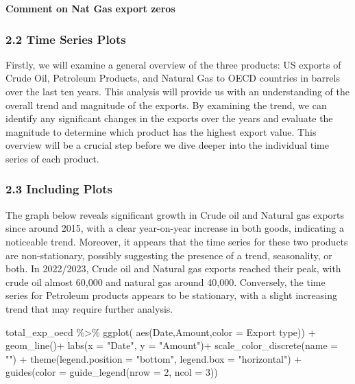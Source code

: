 \documentclass[
]{article}
\newenvironment{Shaded}{\begin{snugshade}}{\end{snugshade}}
\newcommand{\AttributeTok}[1]{\textcolor[rgb]{0.77,0.63,0.00}{#1}}
\newcommand{\DecValTok}[1]{\textcolor[rgb]{0.00,0.00,0.81}{#1}}
\newcommand{\FunctionTok}[1]{\textcolor[rgb]{0.00,0.00,0.00}{#1}}
\newcommand{\NormalTok}[1]{#1}
\newcommand{\SpecialCharTok}[1]{\textcolor[rgb]{0.00,0.00,0.00}{#1}}
\newcommand{\StringTok}[1]{\textcolor[rgb]{0.31,0.60,0.02}{#1}}
\begin{document}
\textbf{Comment on Nat Gas export zeros}

\hypertarget{time-series-plots}{%
\subsubsection{2.2 Time Series Plots}\label{time-series-plots}}

Firstly, we will examine a general overview of the three products: US
exports of Crude Oil, Petroleum Products, and Natural Gas to OECD
countries in barrels over the last ten years. This analysis will provide
us with an understanding of the overall trend and magnitude of the
exports. By examining the trend, we can identify any significant changes
in the exports over the years and evaluate the magnitude to determine
which product has the highest export value. This overview will be a
crucial step before we dive deeper into the individual time series of
each product.

\hypertarget{including-plots}{%
\subsubsection{2.3 Including Plots}\label{including-plots}}

The graph below reveals significant growth in Crude oil and Natural gas
exports since around 2015, with a clear year-on-year increase in both
goods, indicating a noticeable trend. Moreover, it appears that the time
series for these two products are non-stationary, possibly suggesting
the presence of a trend, seasonality, or both. In 2022/2023, Crude oil
and Natural gas exports reached their peak, with crude oil almost 60,000
and natural gas around 40,000. Conversely, the time series for Petroleum
products appears to be stationary, with a slight increasing trend that
may require further analysis.

\begin{Shaded}
\begin{Highlighting}[]
\NormalTok{total\_exp\_oecd }\SpecialCharTok{\%\textgreater{}\%} \FunctionTok{ggplot}\NormalTok{(}
 \FunctionTok{aes}\NormalTok{(Date,Amount,}\AttributeTok{color =} \StringTok{\textasciigrave{}}\AttributeTok{Export type}\StringTok{\textasciigrave{}}\NormalTok{)) }\SpecialCharTok{+}
   \FunctionTok{geom\_line}\NormalTok{()}\SpecialCharTok{+}
   \FunctionTok{labs}\NormalTok{(}\AttributeTok{x =} \StringTok{"Date"}\NormalTok{, }\AttributeTok{y =} \StringTok{"Amount"}\NormalTok{)}\SpecialCharTok{+}
    \FunctionTok{scale\_color\_discrete}\NormalTok{(}\AttributeTok{name =} \StringTok{""}\NormalTok{) }\SpecialCharTok{+}
  \FunctionTok{theme}\NormalTok{(}\AttributeTok{legend.position =} \StringTok{"bottom"}\NormalTok{, }\AttributeTok{legend.box =} \StringTok{"horizontal"}\NormalTok{) }\SpecialCharTok{+}
  \FunctionTok{guides}\NormalTok{(}\AttributeTok{color =} \FunctionTok{guide\_legend}\NormalTok{(}\AttributeTok{nrow =} \DecValTok{2}\NormalTok{, }\AttributeTok{ncol =} \DecValTok{3}\NormalTok{))}
\end{Highlighting}
\end{Shaded}
\end{document}

